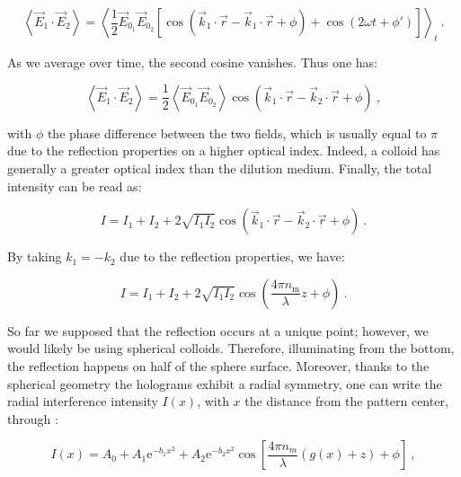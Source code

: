 \begin{equation}
	\left\langle  
	\vec{E}_1 \cdot \vec{E}_2\right\rangle = 
	\left\langle
	\frac{1}{2} \vec{E}_{0_1}  \vec{E}_{0_2} 
	\left[
	\cos 
	\left(
	\vec{k}_1 \cdot \vec{r} - \vec{k}_1 \cdot \vec{r} + \phi 
	\right) 
	+ 
	\cos
	\left(
	2\omega t + \phi'
	\right)
	\right]
	\right\rangle_t~.
\end{equation}

As we average over time, the second cosine vanishes. Thus one has:

\begin{equation}
	\left\langle \vec{E}_1 \cdot \vec{E}_2 \right\rangle = \frac{1}{2} \left\langle  \vec{E}_{0_1}  \vec{E}_{0_2}\right\rangle
	\cos 
	\left(
	\vec{k}_1 \cdot \vec{r} - \vec{k}_2 \cdot \vec{r} + \phi 
	\right)  ~,
\end{equation}

with $\phi$ the phase difference between the two fields, which is usually equal to $\pi$ due to the reflection properties on a higher optical index. Indeed, a colloid has generally a greater optical index than the dilution medium.  Finally, the total intensity can be read as:


\begin{equation}
	I = I_1 + I_2 + 2 \sqrt{I_1 I_2} 
	\cos 
	\left(
	\vec{k}_1 \cdot \vec{r} - \vec{k}_2 \cdot \vec{r} + \phi 
	\right) ~.
\end{equation}

By taking $k_1 = - k_2$ due to the reflection properties, we have:


\begin{equation}
	I = I_1 + I_2 + 2 \sqrt{I_1 I_2} 
	\cos 
	\left(
	\frac{4 \pi n_{\mathrm{m}}}{\lambda} z + \phi 
	\right) ~.
\end{equation}


So far we supposed that the reflection occurs at a unique point; however, we would likely be using spherical colloids. Therefore, illuminating from the bottom, the reflection happens on half of the sphere surface. Moreover, thanks to the spherical geometry the holograms exhibit a radial symmetry, one can write the radial interference intensity $I(x)$, with $x$ the distance from the pattern center, through \cite{ raedler_measurement_1992}:


\begin{equation}
	I(x) = A_0 + A_1 \mathrm{e}^{-b_1 x^2} + A_2\mathrm{e}^{-b_2 x^2} \cos \left[ \frac{4\pi n_m}{\lambda}\left( g(x) + z \right) + \phi \right] ~,
	\label{Eq.RICM}
\end{equation}

